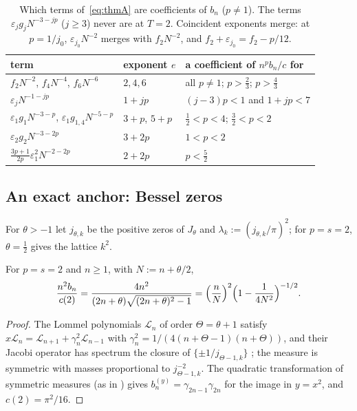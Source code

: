 \begin{table}[ht]
\centering
\small
\begin{tabular}{lll}
\toprule
term & exponent $e$ & a coefficient of $n^pb_n/c$ for\\
\midrule
$f_2N^{-2}$, $f_4N^{-4}$, $f_6N^{-6}$ & $2,4,6$ & all $p\ne1$; $p>\frac23$; $p>\frac43$\\
$\varepsilon_jN^{-1-jp}$ & $1+jp$ & $(j-3)p<1$ and $1+jp<7$\\
$\varepsilon_1g_1N^{-3-p}$, $\varepsilon_1g_{1,4}N^{-5-p}$ & $3+p$, $5+p$ & $\frac12<p<4$; $\frac32<p<2$\\
$\varepsilon_2g_2N^{-3-2p}$ & $3+2p$ & $1<p<2$\\
$\frac{3p+1}{2p}\varepsilon_1^2N^{-2-2p}$ & $2+2p$ & $p<\frac52$\\
\bottomrule
\end{tabular}
\caption{Which terms of~\eqref{eq:thmA} are coefficients of $b_n$ ($p\ne1$). The terms $\varepsilon_jg_jN^{-3-jp}$ ($j\ge3$) never are at $T=2$.
Coincident exponents merge: at $p=1/j_0$, $\varepsilon_{j_0}N^{-2}$ merges with $f_2N^{-2}$, and $f_2+\varepsilon_{j_0}=f_2-p/12$.}
\label{tab:visible}
\end{table}

\subsection{An exact anchor: Bessel zeros}\label{sec:bessel}
For $\theta>-1$ let $j_{\theta,k}$ be the positive zeros of $J_\theta$ and $\lambda_k:=(j_{\theta,k}/\pi)^2$; for $p=s=2$, $\theta=\frac12$ gives the lattice
$k^2$.

\begin{proposition}\label{prop:bessel}
For $p=s=2$ and $n\ge1$, with $N:=n+\theta/2$,
\[
  \frac{n^2b_n}{c(2)}=\frac{4n^2}{(2n+\theta)\sqrt{(2n+\theta)^2-1}}=\Bigl(\frac nN\Bigr)^2\Bigl(1-\frac1{4N^2}\Bigr)^{-1/2}.
\]
\end{proposition}

\begin{proof}
The Lommel polynomials $\mathcal L_n$ of order $\Theta=\theta+1$ satisfy $x\mathcal L_n=\mathcal L_{n+1}+\gamma_n^2\mathcal L_{n-1}$ with $\gamma_n^2=1/(4(n+\Theta-1)(n+\Theta))$, and their Jacobi
operator has spectrum the closure of $\{\pm1/j_{\Theta-1,k}\}$ \cite[\S3]{VA}; the measure is symmetric with masses proportional to
$j_{\Theta-1,k}^{-2}$.
The quadratic transformation of symmetric measures (as in \cite[Remark~9.6]{PaperII}) gives $b_n^{(y)}=\gamma_{2n-1}\gamma_{2n}$ for the image in
$y=x^2$, and $c(2)=\pi^2/16$.
\end{proof}

